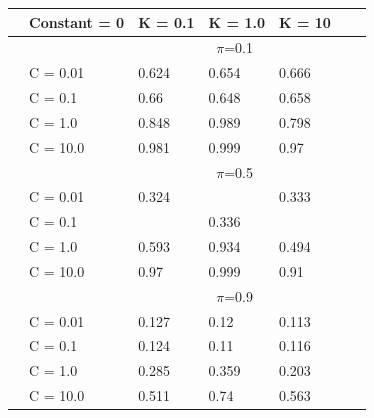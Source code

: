 \documentclass[english]{report}
\begin{document}
\begin{table}[H]
    \centering
    \begin{tabular}{ll|lllll}
        \hline
                                & \textbf{Constant = 0} &         K = 0.1 & K = 1.0 & K = 10 \\ \hline
                                & & \multicolumn{3}{c}{$\pi$=0.1} \\ \hline
                                & C = 0.01   & 0.624 & 0.654 & 0.666    \\
                                & C = 0.1    & 0.66 & 0.648 & 0.658  \\
                                & C = 1.0    & 0.848 & 0.989 & 0.798    \\
                                & C = 10.0   & 0.981 & 0.999 & 0.97  \\ \hline

                                & & \multicolumn{3}{c}{$\pi$=0.5} \\ \hline
                                & C = 0.01   & 0.324 & \color{red}{0.331} & 0.333   \\
                                & C = 0.1    & \color{red}{0.321} & 0.336 & \color{red}{0.317}  \\
                                & C = 1.0    & 0.593 & 0.934 & 0.494    \\
                                & C = 10.0   & 0.97 & 0.999 & 0.91  \\ \hline

                                & & \multicolumn{3}{c}{$\pi$=0.9} \\ \hline
                                & C = 0.01   & 0.127 & 0.12 & 0.113  \\
                                & C = 0.1    & 0.124 & 0.11 & 0.116  \\
                                & C = 1.0    & 0.285 & 0.359 & 0.203    \\
                                & C = 10.0   & 0.511 & 0.74 & 0.563  \\ 
    \hline
    \end{tabular}
    \label{tab:PolySVM_PCA8_c0_valid}
\end{table}
\end{document}
